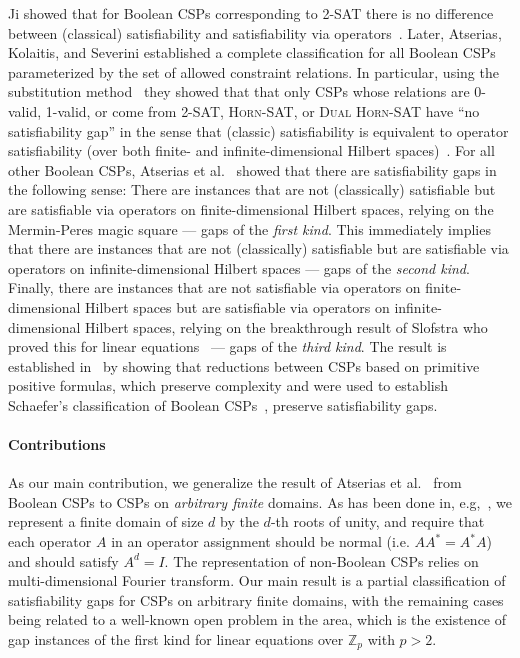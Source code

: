 Ji showed that for Boolean CSPs corresponding to \textsc{2-SAT} there is no difference between (classical)
satisfiability and satisfiability via operators~\cite{Ji13:arxiv-binary}.
Later, Atserias, Kolaitis, and Severini established a complete classification for all Boolean CSPs parameterized by the set of
allowed constraint relations. In particular, using the
substitution method~\cite{Cleve14:icalp} they showed that
that only CSPs whose
relations are 0-valid, 1-valid, or come from \textsc{2-SAT}, \textsc{Horn-SAT}, or \textsc{Dual
Horn-SAT} have ``no satisfiability gap'' in the sense that (classic)
satisfiability is equivalent to operator satisfiability (over both finite- and
infinite-dimensional Hilbert spaces)~\cite{AKS19:jcss}. 
For all other Boolean CSPs, Atserias et al.~\cite{AKS19:jcss} showed that there are
satisfiability gaps in the
following sense: There are instances that are not (classically) satisfiable but are
satisfiable via operators on finite-dimensional Hilbert spaces, relying on the Mermin-Peres magic
square --- gaps of the \emph{first kind}.  This immediately implies that
there are instances that are not (classically) satisfiable but are satisfiable
via operators on infinite-dimensional Hilbert spaces --- gaps
of the \emph{second kind}. Finally, there are instances that are not satisfiable via
operators on finite-dimensional Hilbert spaces but are satisfiable via
operators on infinite-dimensional Hilbert spaces, relying on the 
breakthrough result of Slofstra who proved this for linear
equations~\cite{Slofstra20:jams} --- gaps of the \emph{third kind}.
%
The result is
established in~\cite{AKS19:jcss} by showing that reductions between CSPs based on primitive positive
formulas, which preserve complexity and were used to establish Schaefer's
classification of Boolean CSPs~\cite{Schaefer78:stoc}, preserve satisfiability gaps.

\paragraph{Contributions}

As our main contribution, we generalize the result of Atserias et
al.~\cite{AKS19:jcss} from Boolean CSPs to CSPs on \emph{arbitrary finite}
domains.
%
As has been done in, e.g,~\cite{Culf23:arxiv,Goemans04:jcss,Qassim20:jpa}, we represent a
finite domain of size $d$ by the $d$-th roots of unity, and require that each
operator $A$ in an operator assignment should be normal (i.e. $AA^*=A^*A$) and
should satisfy $A^d=I$. The representation of non-Boolean CSPs relies on
multi-dimensional Fourier transform. Our main result is a partial classification
of satisfiability gaps for CSPs on arbitrary finite domains, with the remaining
cases being related to a well-known open problem in the area, which is the
existence of gap instances of the first kind for linear equations over
$\mathbb{Z}_p$ with $p>2$. 

